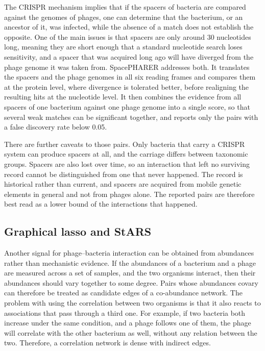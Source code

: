 The CRISPR mechanism implies that if the spacers of bacteria are compared against the genomes of phages, 
one can determine that the bacterium, or an ancestor of it, was infected, while the absence of a match does 
not establish the opposite. One of the main issues is that spacers are only around 30 nucleotides long, meaning 
they are short enough that a standard nucleotide search loses sensitivity, and a spacer that was acquired long 
ago will have diverged from the phage genome it was taken from. SpacePHARER \citep{zhang2021spacepharer} 
addresses both. It translates the spacers and the phage genomes in all six reading frames and compares them at 
the protein level, where divergence is tolerated better, before realigning the resulting hits at the nucleotide 
level. It then combines the evidence from all spacers of one bacterium against one phage genome into a single 
score, so that several weak matches can be significant together, and reports only the pairs with a false 
discovery rate below 0.05.

There are further caveats to those pairs. Only bacteria that carry a CRISPR system can produce spacers at all, 
and the carriage differs between taxonomic groups. Spacers are also lost over time, so an 
interaction that left no surviving record cannot be distinguished from one that never happened. The record is 
historical rather than current, and spacers are acquired from mobile genetic elements in general and not from 
phages alone. The reported pairs are therefore best read as a lower bound of the interactions that 
happened.

\subsection{Graphical lasso and StARS}
Another signal for phage--bacteria interaction can be obtained from abundances rather than mechanistic evidence.
If the abundances of a bacterium and a phage are measured across a set of samples, and the two organisms interact, 
then their abundances should vary together to some degree. Pairs whose abundances covary
can therefore be treated as candidate edges of a co-abundance network. The problem with using the correlation between two organisms is that
it also reacts to associations that pass through a third one. For example, if two bacteria both increase under the
same condition, and a phage follows one of them, the phage will correlate with the other bacterium
as well, without any relation between the two. Therefore, a correlation network is dense with indirect edges.

